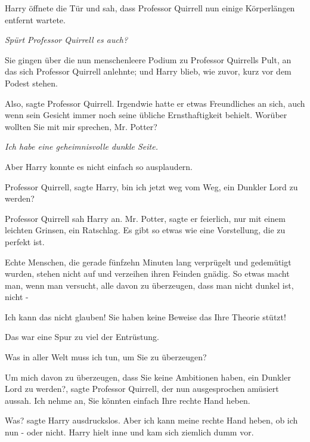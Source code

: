 Harry öffnete die Tür und sah, dass Professor Quirrell nun einige Körperlängen
entfernt wartete.

\emph{Spürt Professor Quirrell es auch? }

Sie gingen über die nun menschenleere Podium zu Professor Quirrells Pult, an das
sich Professor Quirrell anlehnte; und Harry blieb, wie zuvor, kurz vor dem
Podest stehen.

\glqq Also\grqq{}, sagte Professor Quirrell. Irgendwie hatte er etwas
Freundliches an sich, auch wenn sein Gesicht immer noch seine übliche
Ernsthaftigkeit behielt. \glqq Worüber wollten Sie mit mir sprechen, Mr.
Potter?\grqq{}

\emph{Ich habe eine geheimnisvolle dunkle Seite.}

Aber Harry konnte es nicht einfach so ausplaudern.

\glqq Professor Quirrell\grqq{}, sagte Harry, \glqq bin ich jetzt weg vom Weg,
ein Dunkler Lord zu werden?\grqq{}

Professor Quirrell sah Harry an. \glqq Mr. Potter\grqq{}, sagte er feierlich,
nur mit einem leichten Grinsen, \glqq ein Ratschlag. Es gibt so etwas wie eine
Vorstellung, die zu perfekt ist.

Echte Menschen, die gerade fünfzehn Minuten lang verprügelt und gedemütigt
wurden, stehen nicht auf und verzeihen ihren Feinden gnädig. So etwas macht man,
wenn man versucht, alle davon zu überzeugen, dass man nicht dunkel ist, nicht
-\grqq{}

\glqq Ich kann das nicht glauben! Sie haben keine Beweise das Ihre Theorie
stützt!\grqq{}

\glqq Das war eine Spur zu viel der Entrüstung.\grqq{}

\glqq Was in aller Welt muss ich tun, um Sie zu überzeugen?\grqq{}

\glqq Um mich davon zu überzeugen, dass Sie keine Ambitionen haben, ein Dunkler
Lord zu werden?\grqq{}, sagte Professor Quirrell, der nun ausgesprochen
amüsiert aussah. \glqq Ich nehme an, Sie könnten einfach Ihre rechte Hand
heben.\grqq{}

\glqq Was?\grqq{} sagte Harry ausdruckslos. \glqq Aber ich kann meine rechte
Hand heben, ob ich nun - oder nicht.\grqq{} Harry hielt inne und kam sich
ziemlich dumm vor.

